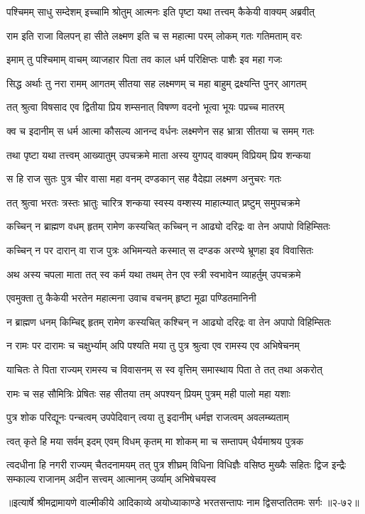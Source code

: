 \twolineshloka
{पश्चिमम् साधु सम्देशम् इच्चामि श्रोतुम् आत्मनः}
{इति पृष्टा यथा तत्त्वम् कैकेयी वाक्यम् अब्रवीत्} %

\twolineshloka
{राम इति राजा विलपन् हा सीते लक्ष्मण इति च}
{स महात्मा परम् लोकम् गतः गतिमताम् वरः} %

\twolineshloka
{इमाम् तु पश्चिमाम् वाचम् व्याजहार पिता तव}
{काल धर्म परिक्षिप्तः पाशैः इव महा गजः} %

\twolineshloka
{सिद्ध अर्थाः तु नरा रामम् आगतम् सीतया सह}
{लक्ष्मणम् च महा बाहुम् द्रक्ष्यन्ति पुनर् आगतम्} %

\twolineshloka
{तत् श्रुत्वा विषसाद एव द्वितीया प्रिय शम्सनात्}
{विषण्ण वदनो भूत्वा भूयः पप्रच्च मातरम्} %

\twolineshloka
{क्व च इदानीम् स धर्म आत्मा कौसल्य आनन्द वर्धनः}
{लक्ष्मणेन सह भ्रात्रा सीतया च समम् गतः} %

\twolineshloka
{तथा पृष्टा यथा तत्त्वम् आख्यातुम् उपचक्रमे}
{माता अस्य युगपद् वाक्यम् विप्रियम् प्रिय शन्कया} %

\twolineshloka
{स हि राज सुतः पुत्र चीर वासा महा वनम्}
{दण्डकान् सह वैदेह्या लक्ष्मण अनुचरः गतः} %

\twolineshloka
{तत् श्रुत्वा भरतः त्रस्तः भ्रातुः चारित्र शन्कया}
{स्वस्य वम्शस्य माहात्म्यात् प्रष्टुम् समुपचक्रमे} %

\twolineshloka
{कच्चिन् न ब्राह्मण वधम् हृतम् रामेण कस्यचित्}
{कच्चिन् न आढ्यो दरिद्रः वा तेन अपापो विहिम्सितः} %

\twolineshloka
{कच्चिन् न पर दारान् वा राज पुत्रः अभिमन्यते}
{कस्मात् स दण्डक अरण्ये भ्रूणहा इव विवासितः} %

\twolineshloka
{अथ अस्य चपला माता तत् स्व कर्म यथा तथम्}
{तेन एव स्त्री स्वभावेन व्याहर्तुम् उपचक्रमे} %

\twolineshloka
{एवमुक्ता तु कैकेयी भरतेन महात्मना}
{उवाच वचनम् हृष्टा मूढा पण्डितमानिनी} %

\twolineshloka
{न ब्राह्मण धनम् किम्चिद्द् हृतम् रामेण कस्यचित्}
{कश्चिन् न आढ्यो दरिद्रः वा तेन अपापो विहिम्सितः} %

\twolineshloka
{न रामः पर दारामः च चक्षुर्भ्याम् अपि पश्यति}
{मया तु पुत्र श्रुत्वा एव रामस्य एव अभिषेचनम्} %

\twolineshloka
{याचितः ते पिता राज्यम् रामस्य च विवासनम्}
{स स्व वृत्तिम् समास्थाय पिता ते तत् तथा अकरोत्} %

\twolineshloka
{रामः च सह सौमित्रिः प्रेषितः सह सीतया}
{तम् अपश्यन् प्रियम् पुत्रम् मही पालो महा यशाः} %

\twolineshloka
{पुत्र शोक परिद्यूनः पन्चत्वम् उपपेदिवान्}
{त्वया तु इदानीम् धर्मज्ञ राजत्वम् अवलम्ब्यताम्} %

\twolineshloka
{त्वत् कृते हि मया सर्वम् इदम् एवम् विधम् कृतम्}
{मा शोकम् मा च सम्तापम् धैर्यमाश्रय पुत्रक} %

\twolineshloka
{त्वदधीना हि नगरी राज्यम् चैतदनामयम्}
{तत् पुत्र शीघ्रम् विधिना विधिज्ञैः}
{वसिष्ठ मुख्यैः सहितः द्विज इन्द्रैः}
{सम्काल्य राजानम् अदीन सत्त्वम्}
{आत्मानम् उर्व्याम् अभिषेचयस्व} %


॥इत्यार्षे श्रीमद्रामायणे वाल्मीकीये आदिकाव्ये अयोध्याकाण्डे भरतसन्तापः नाम द्विसप्ततितमः सर्गः ॥२-७२॥
